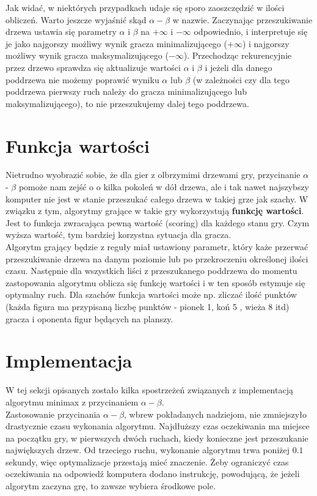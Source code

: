 \documentclass[licencjacka]{pracamgr}
\begin{document}
Jak widać, w niektórych przypadkach udaje się sporo zaoszczędzić w ilości obliczeń.  Warto jeszcze wyjaśnić skąd $\alpha - \beta$ w nazwie. Zaczynając przeszukiwanie drzewa ustawia się parametry $\alpha$ i $\beta$ na $+\infty$ i $-\infty$ odpowiednio, i interpretuje się je jako najgorszy możliwy wynik gracza minimalizującego ($+\infty$) i  najgorszy możliwy wynik gracza maksymalizującego ($-\infty$). Przechodząc rekurencyjnie przez drzewo sprawdza się aktualizuje wartości $\alpha$ i $\beta$ i jeżeli dla danego poddrzewa  nie możemy poprawić wyniku  $\alpha$ lub  $\beta$ (w zależności czy dla tego poddrzewa pierwszy ruch należy do gracza minimalizującego lub maksymalizującego), to nie przeszukujemy dalej tego poddrzewa.


\section{Funkcja wartości}
Nietrudno wyobrazić sobie, że dla gier z olbrzymimi drzewami gry, przycinanie $\alpha$ - $\beta$ pomoże nam zejść o o kilka pokoleń w dół drzewa, ale i tak nawet najszybszy komputer nie jest w stanie przeszukać całego drzewa w takiej grze jak szachy. W związku z tym,  algorytmy grające w takie gry wykorzystują \textbf{funkcję wartości}. Jest to funkcja zwracająca pewną wartość (scoring) dla każdego stanu gry. Czym wyższa wartość, tym bardziej korzystna sytuacja dla gracza. \\

Algorytm grający będzie z reguły miał ustawiony parametr, który każe przerwać przeszukiwanie drzewa na danym poziomie lub po przekroczeniu określonej ilości czasu. Następnie dla wszystkich liści z przeszukanego poddrzewa do momentu zastopowania algorytmu oblicza się funkcję wartości i w ten sposób estymuje się optymalny ruch.  Dla szachów funkcja wartości może np. zliczać ilość punktów (każda figura ma przypisaną liczbę punktów - pionek 1, koń 5 , wieża 8 itd)  gracza i oponenta figur będących na planszy. 


\section{Implementacja}
 W tej sekcji opisanych zostało  kilka spostrzeżeń związanych z implementacją algorytmu minimax z przycinaniem $\alpha - \beta$.\\

Zastosowanie przycinania $\alpha - \beta$, wbrew pokładanych nadziejom, nie zmniejszyło drastycznie  czasu wykonania algorytmu. Najdłuższy czas oczekiwania ma miejsce na początku gry, w pierwszych dwóch ruchach,  kiedy konieczne jest przeszukanie największych drzew. Od trzeciego ruchu, wykonanie algorytmu trwa poniżej $0.1$ sekundy, więc optymalizacje przestają mieć znaczenie.  Żeby ograniczyć czas oczekiwania na odpowiedź komputera dodano instrukcję, powodującą, że jeżeli algorytm zaczyna grę, to zawsze wybiera środkowe pole.\\
\end{document}
